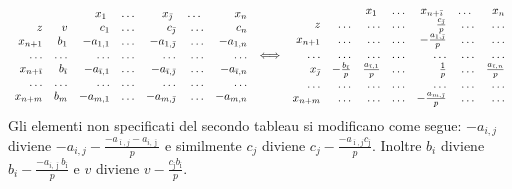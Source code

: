 \documentclass[10pt]{article}
\begin{document}
\[
   \begin{array}{rrrrrrr}
   &	  & x_1 \; & \ldots  & x_{\bar{\jmath}} \; & \ldots  \; & x_n\\
   z    & v & c_1 & \ldots & c_{\bar{\jmath}} & \ldots &  c_n \\        
   x_{n+1}  &  b_1 & -a_{1,1} & \ldots & -a_{1,{\bar{\jmath}}} & \ldots & -a_{1,n} \\
   \ldots  & \ldots  & \ldots & \ldots  & \ldots & \ldots  & \ldots \\
   x_{n+\bar{\imath}}  &  b_{\bar{\imath}} & -a_{{\bar{\imath}},1} & \ldots & -a_{{\bar{\imath}},{\bar{\jmath}}} & \ldots & -a_{{\bar{\imath}},n} \\
   \ldots  & \ldots  & \ldots & \ldots  & \ldots & \ldots  & \ldots \\
   x_{n+m}  &  b_m & -a_{m,1} & \ldots & -a_{m,{\bar{\jmath}}} & \ldots & -a_{m,n} \\
   \end{array}
\hspace{0.2cm}
{\Huge \Longleftrightarrow}
\hspace{0.2cm}
   \begin{array}{rrrrrrr}
         & & x_1 \; & \ldots  & x_{n+\bar{\imath}} \; & \ldots  \; & x_n\\
         z    &  \ldots & \ldots & \ldots & \frac{c_{\bar{\jmath}}}{p} & \ldots & \ldots \\         
      x_{n+1} &  \ldots & \ldots & \ldots & -\frac{a_{1,\bar{\jmath}}}{p} & \ldots & \ldots  \\
      \ldots  & \ldots  & \ldots & \ldots  & \ldots & \ldots  & \ldots \\
      x_{\bar{\jmath}} &  -\frac{b_{\bar{\imath}}}{p} & \frac{a_{\bar{\imath},1}}{p} & \ldots & \frac{1}{p} & \ldots & \frac{a_{\bar{\imath},n}}{p} \\
      \ldots  & \ldots  & \ldots & \ldots  & \ldots & \ldots  & \ldots \\
      x_{n+m} & \ldots & \ldots & \ldots & -\frac{a_{m,\bar{\jmath}}}{p} & \ldots & \ldots \\
   \end{array}
\]
Gli elementi non specificati del secondo tableau
si modificano come segue:
$-a_{i,j}$ diviene $-a_{i,j}-\frac{-a_{\bar{\imath},j}-a_{i,\bar{\jmath}}}{p}$ e 
similmente $c_j$ diviene $c_j-\frac{-a_{\bar{\imath},j}c_{\bar{\jmath}}}{p}$.
Inoltre $b_i$ diviene $b_i-\frac{-a_{i,\bar{\jmath}}b_{\bar{\imath}}}{p}$
e $v$ diviene $v-\frac{c_{\bar{\jmath}}b_{\bar{\imath}}}{p}$.\\ 
\end{document}
